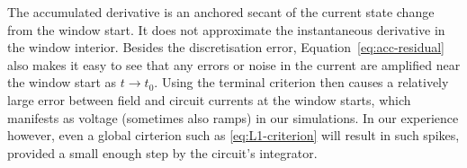 The accumulated derivative is an anchored secant of the current state change from the window start. It does not approximate the instantaneous derivative in the window interior. Besides the discretisation error, Equation~\eqref{eq:acc-residual} also makes it easy to see that any errors or noise in the current are amplified near the window start as $t \rightarrow t_0$. Using the terminal criterion then causes a relatively large error between field and circuit currents at the window starts, which manifests as voltage  (sometimes also ramps) in our simulations. In our experience however, even a global cirterion such as \eqref{eq:L1-criterion} will result in such spikes, provided a small enough step by the circuit's integrator.